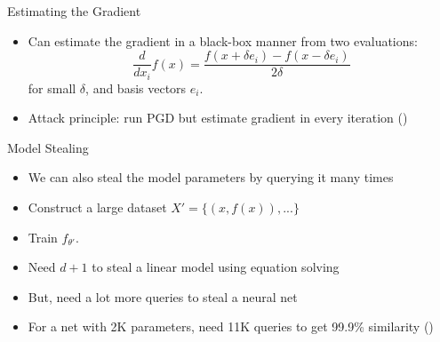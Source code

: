\documentclass[10pt]{beamer}
\begin{document}
\begin{frame}{Estimating the Gradient}

  \begin{itemize}[<+-| @alert+>]
    \item Can estimate the gradient in a black-box manner from two evaluations:
      \[
        \frac{d}{dx_i} f(x) = \frac{f(x + \delta e_i) - f(x - \delta e_i)}{2\delta}
      \]
      for small $\delta$, and basis vectors $e_i$.
    \item Attack principle: run PGD but estimate gradient in every iteration (\cite{ChenZSYH17})
  \end{itemize}

  \pause


\end{frame}


\begin{frame}{Model Stealing}

  \begin{itemize}[<+-| @alert+>]
    \item We can also steal the model parameters by querying it many times
    \item Construct a large dataset $X' = \{(x, f(x)), ...\}$
    \item Train $f_{\theta'}$.
  \end{itemize}

  \pause


  \pause
  \begin{itemize}[<+-| @alert+>]
    \item Need $d + 1$ to steal a linear model using equation solving
    \item But, need a lot more queries to steal a neural net
    \item For a net with 2K parameters, need 11K queries to get 99.9\% similarity (\cite{TramerZJRR16})
  \end{itemize}

\end{frame}
\end{document}
